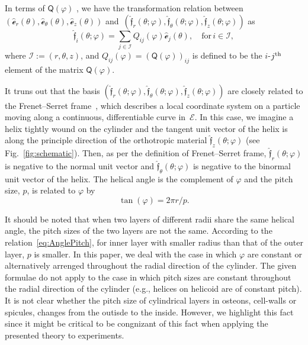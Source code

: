\documentclass[preprint,12pt,times]{elsarticle}
\numberwithin{equation}{section}
\newcommand{\physe}{\hat{\mathscr{e}}} %
\newcommand{\physf}{\hat{\boldsymbol{\mathfrak{f}}}}
\renewcommand{\u}[1]{\boldsymbol{#1}}
\newcommand{\usf}[1]{\u{\mathsf #1}}
\newcommand{\pr}[1]{\left( #1 \right)}
\renewcommand{\>}{$\Rightarrow$}
\begin{document}
In terms of $\usf{Q}(\varphi)$ , we have the transformation relation between~$(\physe_{r}(\theta),\physe_{\theta}(\theta),\physe_{z}(\theta))$ and~$\pr{\physf_{r}(\theta;\varphi),\physf_{\theta}(\theta;\varphi),\physf_{z}(\theta;\varphi)}$ as
\begin{equation}
\physf_{i} (\theta;\varphi) = \sum_{j \in \mathcal{I} } Q_{ij}(\varphi)\physe_{j}(\theta), \quad \text{for} \,i \in \mathcal{I} ,
\label{eq:Qtransform}
\end{equation}
where $\mathcal{I} :=\pr{r,\theta,z}$, and $Q_{ij}(\varphi) = \pr{\usf{Q}(\varphi)}_{ij}$ is defined to be the $i$-$j^{\rm th}$ element of the matrix $\usf{Q}(\varphi)$.

It truns out that the basis $\pr{\physf_{r}(\theta;\varphi),\physf_{\theta}(\theta;\varphi),\physf_{z}(\theta;\varphi)}$ are closely related to the Frenet–Serret frame~\cite{forsyth1912lectures}, which describes a local coordinate system on a particle moving along a continuous, differentiable curve in~$\mathcal{E}$. In this case, we imagine a helix tightly wound on the cylinder and the tangent unit vector of the helix is along the principle direction of the orthotropic material $\physf_{z}(\theta;\varphi)$ (see Fig.~\ref{fig:schematic}). Then, as per the definition of Frenet–Serret frame, $\physf_{r}(\theta;\varphi)$ is negative to the normal unit vector and $\physf_{\theta}(\theta;\varphi)$ is negative to the binormal unit vector of the helix.
The helical angle is the complement of $\varphi$ and the pitch size, $p$, is related to $\varphi$ by
\begin{equation}
\tan(\varphi) = 2 \pi r/p.
\label{eq:AnglePitch}
\end{equation}

It should be noted that when two layers of different radii share the same helical angle, the pitch sizes of the two layers are not the same. According to the relation~\eqref{eq:AnglePitch}, for inner layer with smaller radius than that of the outer layer, $p$ is smaller. In this paper, we deal with the case in which $\varphi$ are constant or alternatively arrenged throughout the radial direction of the cylinder. The given formulae do not apply to the case in which pitch sizes are constant throughout the radial direction of the cylinder (e.g., helices on helicoid are of constant pitch). It is not clear whether the pitch size of cylindrical layers in osteons, cell-walls or spicules, changes from the outisde to the inside. However, we highlight this fact since it might be critical to be congnizant of this fact when applying the presented theory to experiments.
\end{document}
